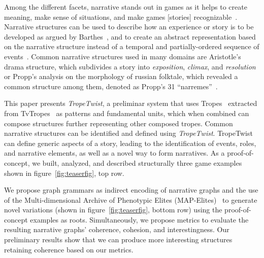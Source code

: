 Among the different facets, narrative stands out in games as it helps to create meaning, make sense of situations, and make games [stories] recognizable~\cite{p12mateas2003-facade,Aarseth2012-Narrativetheory,kybartas2016survey,flodtol2020-WIPMakeSenseDungs}. Narrative structures can be used to describe how an experience or story is to be developed as argued by Barthes~\cite{p12Barthes75-introStructNarr}, and to create an abstract representation based on the narrative structure instead of a temporal and partially-ordered sequence of events~\cite{p12Szilas2003-structuralModelsIDtension}. Common narrative structures used in many domains are Aristotle's drama structure, which subdivides a story into \textit{exposition}, \textit{climax}, and \textit{resolution} or Propp's analysis on the morphology of russian folktale, which revealed a common structure among them, denoted as Propp's 31 ``narremes''~\cite{p12propp1975-morphology}.

This paper presents \emph{TropeTwist}, a preliminar system that uses Tropes~\cite{p12Thompson2018-usingTropesNarrativeEvents,tropesSimpsons} extracted from TvTropes~\cite{p12tvtropes,periodicTable} as patterns and fundamental units, which when combined can compose structures further representing other composed tropes. Common narrative structures can be identified and defined using \emph{TropeTwist}. TropeTwist can define generic aspects of a story, leading to the identification of events, roles, and narrative elements, as well as a novel way to form narratives. As a proof-of-concept, we built, analyzed, and described structurally three game examples shown in figure~\ref{fig:teaserfig}, top row.


We propose graph grammars as indirect encoding of narrative graphs and the use of the Multi-dimensional Archive of Phenotypic Elites (MAP-Elites)~\cite{p12Mouret2015-MAPElites} to generate novel variations (shown in figure~\ref{fig:teaserfig}, bottom row) using the proof-of-concept examples as roots. Simultaneously, we propose metrics to evaluate the resulting narrative graphs' coherence, cohesion, and interestingness. Our preliminary results show that we can produce more interesting structures retaining coherence based on our metrics. 

